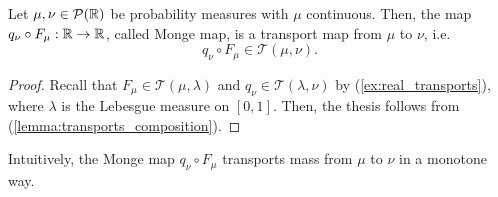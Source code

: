 \documentclass[../main.tex]{subfiles}
\begin{document}
\begin{proposition}
    Let $\mu, \nu\in\mathcal{P}(\mathbb{R})$ be probability measures with $\mu$ continuous. Then, the map $q_\nu \circ F_\mu : \mathbb{R} \to \mathbb{R}$, called Monge map, is a transport map from $\mu$ to $\nu$, i.e.
    $$
    q_\nu \circ F_\mu \in \mathcal{T}(\mu, \nu).
    $$
\end{proposition}
\begin{proof}
    Recall that $F_\mu\in\mathcal{T}(\mu, \lambda)$ and $q_\nu\in\mathcal{T}(\lambda, \nu)$ by (\ref{ex:real_transports}), where $\lambda$ is the Lebesgue measure on $[0,1]$. Then, the thesis follows from (\ref{lemma:transports_composition}).
\end{proof}
\noindent
Intuitively, the Monge map $q_\nu\circ F_\mu$ transports mass from $\mu$ to $\nu$ in a monotone way.\\
\end{document}
